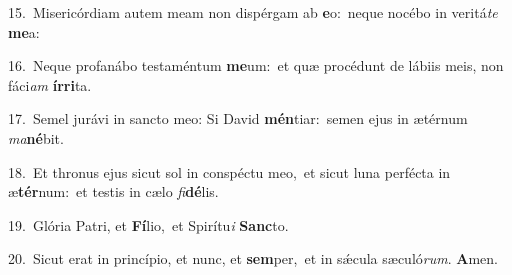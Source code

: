 {\numbfont\textcolor{\numbcolor}{15.}}~Misericórdiam autem meam non dispérgam ab \textbf{e}\-o:~\star neque nocébo in veritá\textit{te} \textbf{me}\-a:\par
{\numbfont\textcolor{\numbcolor}{16.}}~Neque profanábo testaméntum \textbf{me}\-um:~\star et quæ procédunt de lábiis meis, non fáci\textit{am} \textbf{ír}\-\textbf{ri}ta.\par
{\numbfont\textcolor{\numbcolor}{17.}}~Semel jurávi in sancto meo: Si David \textbf{mén}\-tiar:~\star semen ejus in ætérnum \textit{ma}\-\textbf{né}bit.\par
{\numbfont\textcolor{\numbcolor}{18.}}~Et thronus ejus sicut sol in conspéctu meo,~\dagger et sicut luna perfécta in æ\-\textbf{tér}\-num:~\star et testis in cælo \textit{fi}\-\textbf{dé}lis.\par
{\numbfont\textcolor{\numbcolor}{19.}}~Glória Patri, et \textbf{Fí}\-lio,~\star et Spirítu\textit{i} \textbf{Sanc}\-to.\par
{\numbfont\textcolor{\numbcolor}{20.}}~Sicut erat in princípio, et nunc, et \textbf{sem}\-per,~\star et in sǽcula sæculó\-\textit{rum}\-. \textbf{A}\-men.\par
